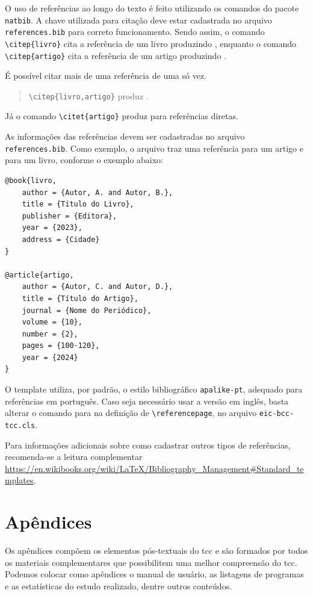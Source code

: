 \documentclass{eic-bcc-tcc}
\begin{document}
O uso de referências ao longo do texto é feito utilizando os comandos do pacote \texttt{natbib}. A chave utilizada para citação deve estar cadastrada no arquivo \texttt{references.bib} para correto funcionamento. Sendo assim, o comando \verb|\citep{livro}| cita a referência de um livro produzindo \citep{livro}, enquanto o comando \verb|\citep{artigo}| cita a referência de um artigo produzindo \citep{artigo}.

É possível citar mais de uma referência de uma só vez.

\begin{quote}
\verb|\citep{livro,artigo}| produz \citep{livro,artigo}.
\end{quote}

Já o comando \verb|\citet{artigo}| produz \citet{artigo} para referências diretas.

As informações das referências devem ser cadastradas no arquivo \texttt{references.bib}. Como exemplo, o arquivo traz uma referência para um artigo e para um livro, conforme o exemplo abaixo:
\begin{verbatim}
@book{livro,
    author = {Autor, A. and Autor, B.},
    title = {Título do Livro},
    publisher = {Editora},
    year = {2023},
    address = {Cidade}
}

@article{artigo,
    author = {Autor, C. and Autor, D.},
    title = {Título do Artigo},
    journal = {Nome do Periódico},
    volume = {10},
    number = {2},
    pages = {100-120},
    year = {2024}
}
\end{verbatim}

O template utiliza, por padrão, o estilo bibliográfico \texttt{apalike-pt}, adequado para referências em português. Caso seja necessário usar a versão em inglês, basta alterar o comando \verb|| para \verb|| na definição de \verb|\referencepage|, no arquivo \texttt{eic-bcc-tcc.cls}.

Para informações adicionais sobre como cadastrar outros tipos de referências, recomenda-se a leitura complementar \url{https://en.wikibooks.org/wiki/LaTeX/Bibliography_Management#Standard_templates}.


\section{Apêndices}

Os apêndices compõem os elementos pós-textuais do \gls{tcc} e são formados por todos os materiais complementares que possibilitem uma melhor compreensão do \gls{tcc}. Podemos colocar como apêndices o manual de usuário, as listagens de programas e as estatísticas do estudo realizado, dentre outros conteúdos.
\end{document}
